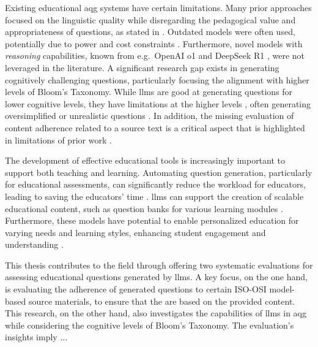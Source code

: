  Existing educational \ac{aqg} systems have certain limitations. Many prior approaches focused on the linguistic quality while disregarding the pedagogical value and appropriateness of questions, as stated in \cite{horbach_linguistic_2020,steuer_i_2021}. Outdated models \cite{cheng_treequestion_2024,elkins_how_2023,bhowmick_automating_2023} were often used, potentially due to power and cost constraints \cite{zhuge_twinstar_2025,vu_chatgpt-based_2024}. Furthermore, novel models with \textit{reasoning} capabilities, known from e.g.\ OpenAI o1 \cite{openai_openai_2024-1} and DeepSeek R1 \cite{deepseek-ai_deepseek-r1_2025}, were not leveraged in the literature. A significant research gap exists in generating cognitively challenging questions, particularly focusing the alignment with higher levels of Bloom's Taxonomy. While \ac{llms} are good at generating questions for lower cognitive levels, they have limitations at the higher levels \cite{elkins_how_2023,scaria_automated_2024}, often generating oversimplified or unrealistic questions \cite{duong-trung_bloomllm_2024}. In addition, the missing evaluation of content adherence related to a source text is a critical aspect that is highlighted in limitations of prior work \cite{doughty_comparative_2024,al_faraby_analysis_2024}.

 The development of effective educational tools is increasingly important to support both teaching and learning. Automating question generation, particularly for educational assessments, can significantly reduce the workload for educators, leading to saving the educators' time \cite{biancini_multiple-choice_2024,hang_mcqgen_2024,vu_chatgpt-based_2024,cheng_treequestion_2024}. 
\ac{llms} can support the creation of scalable educational content, such as question banks for various learning modules \cite{vu_chatgpt-based_2024}. Furthermore, these models have potential to enable personalized education for varying needs and learning styles, enhancing student engagement and understanding \cite{hang_mcqgen_2024}.

This thesis contributes to the field through offering two systematic evaluations for assessing educational questions generated by \ac{llms}. A key focus, on the one hand, is evaluating the adherence of generated questions to certain ISO-OSI model-based source materials, to ensure that the are based on the provided content. This research, on the other hand, also investigates the capabilities of \ac{llms} in \ac{aqg} while considering the cognitive levels of Bloom's Taxonomy.
The evaluation's insights imply ...


